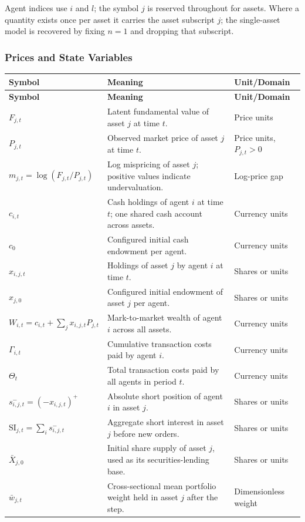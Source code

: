 \documentclass[12pt, a4paper]{article}
\newcommand{\pospart}[1]{\left(#1\right)^{+}}
\begin{document}
    Agent indices use \(i\) and \(l\); the symbol \(j\) is reserved throughout for
    assets. Where a quantity exists once per asset it carries the asset subscript
    \(j\); the single-asset model is recovered by fixing \(n=1\) and dropping that
    subscript.

    \subsubsection*{Prices and State Variables}

    \begin{longtable}{@{}L{0.22\textwidth}L{0.50\textwidth}L{0.20\textwidth}@{}}
        \toprule
        \textbf{Symbol} & \textbf{Meaning} & \textbf{Unit/Domain} \\
        \midrule
        \endfirsthead
        \toprule
        \textbf{Symbol} & \textbf{Meaning} & \textbf{Unit/Domain} \\
        \midrule
        \endhead
        \(F_{j,t}\) & Latent fundamental value of asset \(j\) at time \(t\). & Price units \\
        \(P_{j,t}\) & Observed market price of asset \(j\) at time \(t\). & Price units, \(P_{j,t}>0\) \\
        \(m_{j,t}=\log(F_{j,t}/P_{j,t})\) & Log mispricing of asset \(j\); positive values indicate undervaluation. & Log-price gap \\
        \(c_{i,t}\) & Cash holdings of agent \(i\) at time \(t\); one shared cash account across assets. & Currency units \\
        \(c_0\) & Configured initial cash endowment per agent. & Currency units \\
        \(x_{i,j,t}\) & Holdings of asset \(j\) by agent \(i\) at time \(t\). & Shares or units \\
        \(x_{j,0}\) & Configured initial endowment of asset \(j\) per agent. & Shares or units \\
        \(W_{i,t}=c_{i,t}+\sum_{j}x_{i,j,t}P_{j,t}\) & Mark-to-market wealth of agent \(i\) across all assets. & Currency units \\
        \(\Gamma_{i,t}\) & Cumulative transaction costs paid by agent \(i\). & Currency units \\
        \(\Theta_t\) & Total transaction costs paid by all agents in period \(t\). & Currency units \\
        \(s_{i,j,t}^{-}=\pospart{-x_{i,j,t}}\) & Absolute short position of agent \(i\) in asset \(j\). & Shares or units \\
        \(\mathrm{SI}_{j,t}=\sum_i s_{i,j,t}^{-}\) & Aggregate short interest in asset \(j\) before new orders. & Shares or units \\
        \(\bar X_{j,0}\) & Initial share supply of asset \(j\), used as its securities-lending base. & Shares or units \\
        \(\bar w_{j,t}\) & Cross-sectional mean portfolio weight held in asset \(j\) after the step. & Dimensionless weight \\
        \bottomrule
    \end{longtable}
\end{document}
